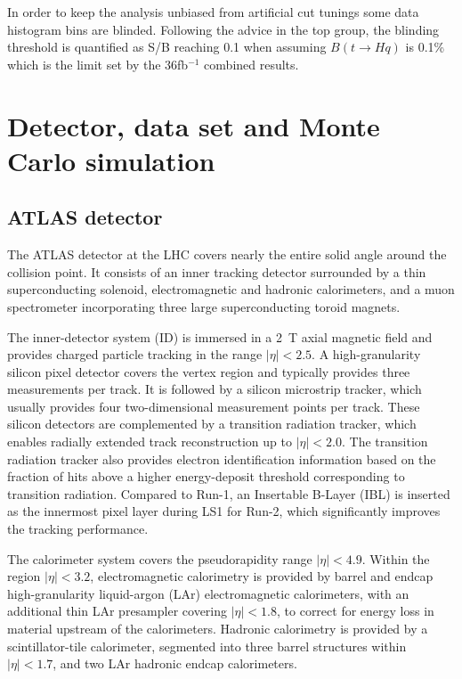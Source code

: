 In order to keep the analysis unbiased from artificial cut tunings some data histogram bins are blinded. Following the advice in the top group, the blinding threshold is quantified as S/B reaching 0.1 when assuming $B(t\rightarrow Hq)$ is 0.1\% which is the limit set by the 36fb$^{-1}$ combined results.

\section{Detector, data set and Monte Carlo simulation}

\subsection{ATLAS detector}
\label{sec:detector}

The ATLAS detector \cite{PERF-2007-01} at the LHC covers nearly the entire solid angle around the collision point. It consists of an inner tracking detector surrounded by a thin superconducting solenoid, electromagnetic and hadronic calorimeters, and a muon spectrometer incorporating three large superconducting toroid magnets.

The inner-detector system (ID) is immersed in a \SI{2}{T} axial magnetic field and provides charged particle tracking in the range $| \eta | < 2.5$. A high-granularity silicon pixel detector covers the vertex region and typically provides three measurements per track. It is followed by a silicon microstrip tracker, which usually provides four two-dimensional measurement points per track. These silicon detectors are complemented by a transition radiation tracker, which enables radially extended track reconstruction up to $| \eta | < 2.0$. The transition radiation tracker also provides electron identification information based on the fraction of hits above a higher energy-deposit threshold corresponding to transition radiation. Compared to Run-1, an Insertable B-Layer \cite{IBL} (IBL) is inserted as the innermost pixel layer during LS1 for Run-2, which significantly improves the tracking performance.

The calorimeter system covers the pseudorapidity range $| \eta | < 4.9$. Within the region $| \eta | < 3.2$, electromagnetic calorimetry is provided by barrel and endcap high-granularity liquid-argon (LAr) electromagnetic calorimeters, with an additional thin LAr presampler covering $| \eta | < 1.8$, to correct for energy loss in material upstream of the calorimeters. Hadronic calorimetry is provided by a scintillator-tile calorimeter, segmented into three barrel structures within $| \eta | < 1.7$, and two LAr hadronic endcap calorimeters.


